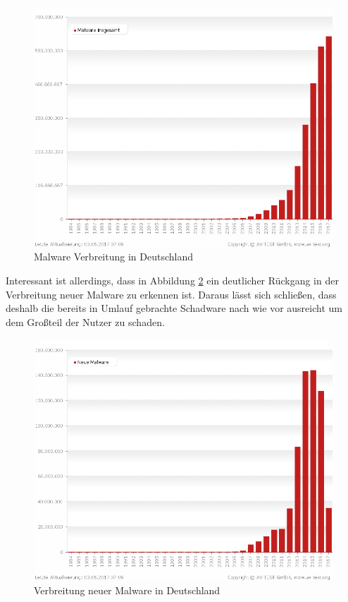 \begin{figure}[H]
  \centering
  \includegraphics[width=14cm]{images/malware-all-years_sum_de}
  \caption[Malware Verbreitung in Deutschland]{Malware Verbreitung in Deutschland\protect\footnotemark}
  \label{fig:malware}
\end{figure}

Interessant ist allerdings, dass in Abbildung \ref{fig:malware-new} ein deutlicher Rückgang in der
Verbreitung neuer Malware zu erkennen ist. Daraus lässt sich schließen, dass deshalb die bereits
in Umlauf gebrachte Schadware nach wie vor ausreicht um dem Großteil der Nutzer zu schaden.

\begin{figure}[H]
  \centering
  \includegraphics[width=14cm]{images/malware-all-years_de}
  \caption[Verbreitung neuer Malware in Deutschland]{Verbreitung neuer Malware in Deutschland\protect\footnotemark}
  \label{fig:malware-new}
\end{figure}

